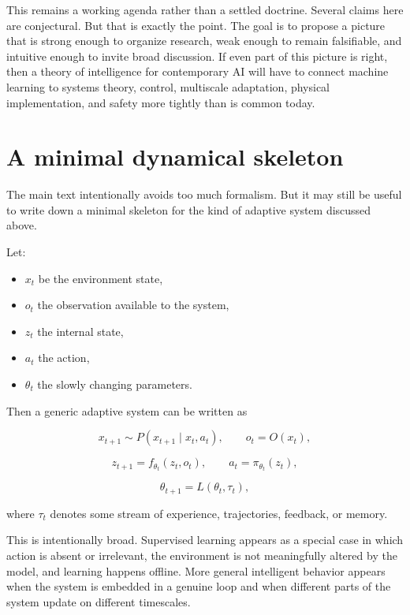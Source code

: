 \documentclass[11pt]{article}
\begin{document}
This remains a working agenda rather than a settled doctrine. Several claims here are conjectural. But that is exactly the point. The goal is to propose a picture that is strong enough to organize research, weak enough to remain falsifiable, and intuitive enough to invite broad discussion. If even part of this picture is right, then a theory of intelligence for contemporary AI will have to connect machine learning to systems theory, control, multiscale adaptation, physical implementation, and safety more tightly than is common today.

\appendix

\section{A minimal dynamical skeleton}


The main text intentionally avoids too much formalism. But it may still be useful to write down a minimal skeleton for the kind of adaptive system discussed above.

Let:

\begin{itemize}
\item \(x_t\) be the environment state,
\item \(o_t\) the observation available to the system,
\item \(z_t\) the internal state,
\item \(a_t\) the action,
\item \(\theta_t\) the slowly changing parameters.

\end{itemize}

Then a generic adaptive system can be written as

\[
x_{t+1} \sim P(x_{t+1}\mid x_t, a_t), \qquad o_t = O(x_t),
\]

\[
z_{t+1} = f_{\theta_t}(z_t, o_t), \qquad a_t = \pi_{\theta_t}(z_t),
\]

\[
\theta_{t+1} = L(\theta_t, \tau_t),
\]

where \(\tau_t\) denotes some stream of experience, trajectories, feedback, or memory.

This is intentionally broad. Supervised learning appears as a special case in which action is absent or irrelevant, the environment is not meaningfully altered by the model, and learning happens offline. More general intelligent behavior appears when the system is embedded in a genuine loop and when different parts of the system update on different timescales.
\end{document}
